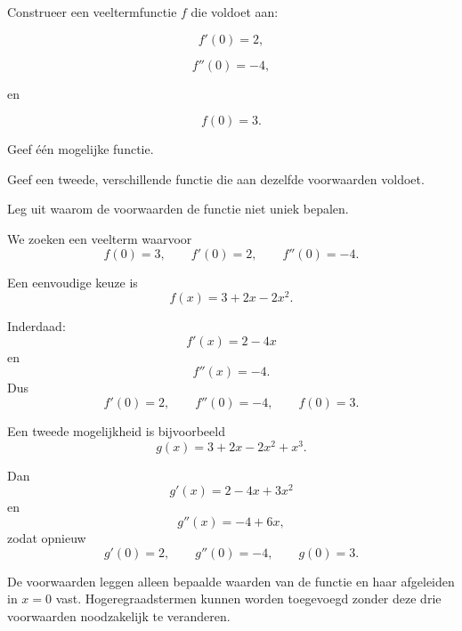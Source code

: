 \documentclass{ximera}
\begin{document}
\begin{oefening}{\oefG}

Construeer een veeltermfunctie $f$ die voldoet aan:

\[
f'(0)=2,
\]

\[
f''(0)=-4,
\]

en

\[
f(0)=3.
\]

\begin{question}
Geef één mogelijke functie.
\end{question}

\begin{question}
Geef een tweede, verschillende functie die aan dezelfde voorwaarden
voldoet.
\end{question}

\begin{question}
Leg uit waarom de voorwaarden de functie niet uniek bepalen.
\end{question}

\begin{oplossing}

We zoeken een veelterm waarvoor
\[
f(0)=3,\qquad f'(0)=2,\qquad f''(0)=-4.
\]

Een eenvoudige keuze is
\[
\boxed{f(x)=3+2x-2x^2}.
\]

Inderdaad:
\[
f'(x)=2-4x
\]
en
\[
f''(x)=-4.
\]
Dus
\[
f'(0)=2,
\qquad
f''(0)=-4,
\qquad
f(0)=3.
\]

Een tweede mogelijkheid is bijvoorbeeld
\[
\boxed{g(x)=3+2x-2x^2+x^3}.
\]

Dan
\[
g'(x)=2-4x+3x^2
\]
en
\[
g''(x)=-4+6x,
\]
zodat opnieuw
\[
g'(0)=2,\qquad g''(0)=-4,\qquad g(0)=3.
\]

De voorwaarden leggen alleen bepaalde waarden van de functie en haar
afgeleiden in $x=0$ vast. Hogeregraadstermen kunnen worden toegevoegd
zonder deze drie voorwaarden noodzakelijk te veranderen.

\end{oplossing}

\end{oefening}
\end{document}
